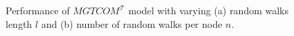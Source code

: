 \begin{figure}[ht!]
\centering
{}\quad
{}\quad
\caption{
Performance of $MGTCOM^{\mathcal{T}}$ model with varying (a) random walks length $l$ and (b) number of random walks per node $n$.
}
\label{fig:hyp_rw_tempo}
\end{figure}    